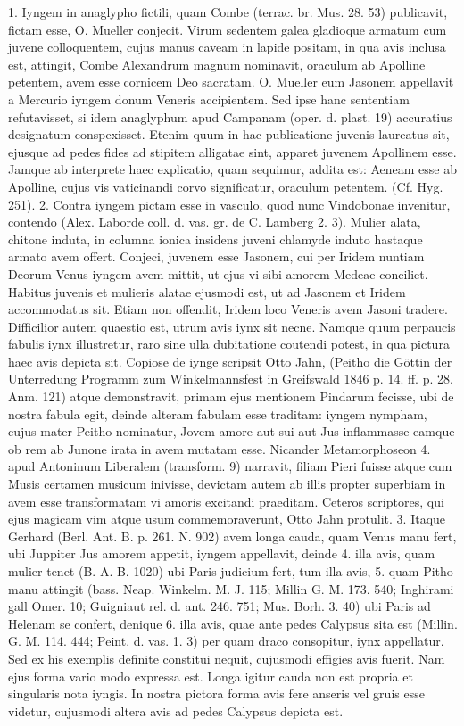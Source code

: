 \documentclass[landscape, a4paper, 11pt, oneside, polutonikogreek, german]{article}
\begin{document}
1. Iyngem in anaglypho fictili, quam Combe (terrac. br. Mus. 28. 53) publicavit, fictam esse, O. Mueller conjecit. Virum sedentem galea gladioque armatum cum juvene colloquentem, cujus manus caveam in lapide positam, in qua avis inclusa est, attingit, Combe Alexandrum magnum nominavit, oraculum ab Apolline petentem, avem esse cornicem Deo sacratam. O. Mueller eum Jasonem appellavit a Mercurio iyngem donum Veneris accipientem. Sed ipse hanc sententiam refutavisset, si idem anaglyphum apud Campanam (oper. d. plast. 19) accuratius designatum conspexisset. Etenim quum in hac publicatione juvenis laureatus sit, ejusque ad pedes fides ad stipitem alligatae sint, apparet juvenem Apollinem esse. Jamque ab interprete haec explicatio, quam sequimur, addita est: Aeneam esse ab Apolline, cujus vis vaticinandi corvo significatur, oraculum petentem. (Cf. Hyg. 251). 2. Contra iyngem pictam esse in vasculo, quod nunc Vindobonae invenitur, contendo (Alex. Laborde coll. d. vas. gr. de C. Lamberg 2. 3). Mulier alata, chitone induta, in columna ionica insidens juveni chlamyde induto hastaque armato avem offert. Conjeci, juvenem esse Jasonem, cui per Iridem nuntiam Deorum Venus iyngem avem mittit, ut ejus vi sibi amorem Medeae conciliet. Habitus juvenis et mulieris alatae ejusmodi est, ut ad Jasonem et Iridem accommodatus sit. Etiam non offendit, Iridem loco Veneris avem Jasoni tradere. Difficilior autem quaestio est, utrum avis iynx sit necne. Namque quum perpaucis fabulis iynx illustretur, raro sine ulla dubitatione coutendi potest, in qua pictura haec avis depicta sit. Copiose de iynge scripsit Otto Jahn, (Peitho die Göttin der Unterredung Programm zum Winkelmannsfest in Greifswald 1846 p. 14. ff. p. 28. Anm. 121) atque demonstravit, primam ejus mentionem Pindarum fecisse, ubi de nostra fabula egit, deinde alteram fabulam esse traditam: iyngem nympham, cujus mater Peitho nominatur, Jovem amore aut sui aut Jus inflammasse eamque ob rem ab Junone irata in avem mutatam esse. Nicander Metamorphoseon 4. apud Antoninum Liberalem (transform. 9) narravit, filiam Pieri fuisse atque cum Musis certamen musicum inivisse, devictam autem ab illis propter superbiam in avem esse transformatam vi amoris excitandi praeditam. Ceteros scriptores, qui ejus magicam vim atque usum commemoraverunt, Otto Jahn protulit. 3. Itaque Gerhard (Berl. Ant. B. p. 261. N. 902) avem longa cauda, quam Venus manu fert, ubi Juppiter Jus amorem appetit, iyngem appellavit, deinde 4. illa avis, quam mulier tenet (B. A. B. 1020) ubi Paris judicium fert, tum illa avis, 5. quam Pitho manu attingit (bass. Neap. Winkelm. M. J. 115; Millin G. M. 173. 540; Inghirami gall Omer. 10; Guigniaut rel. d. ant. 246. 751; Mus. Borh. 3. 40) ubi Paris ad Helenam se confert, denique 6. illa avis, quae ante pedes Calypsus sita est (Millin. G. M. 114. 444; Peint. d. vas. 1. 3) per quam draco consopitur, iynx appellatur. Sed ex his exemplis definite constitui nequit, cujusmodi effigies avis fuerit. Nam ejus forma vario modo expressa est. Longa igitur cauda non est propria et singularis nota iyngis. In nostra pictora forma avis fere anseris vel gruis esse videtur, cujusmodi altera avis ad pedes Calypsus depicta est.
\end{document}
